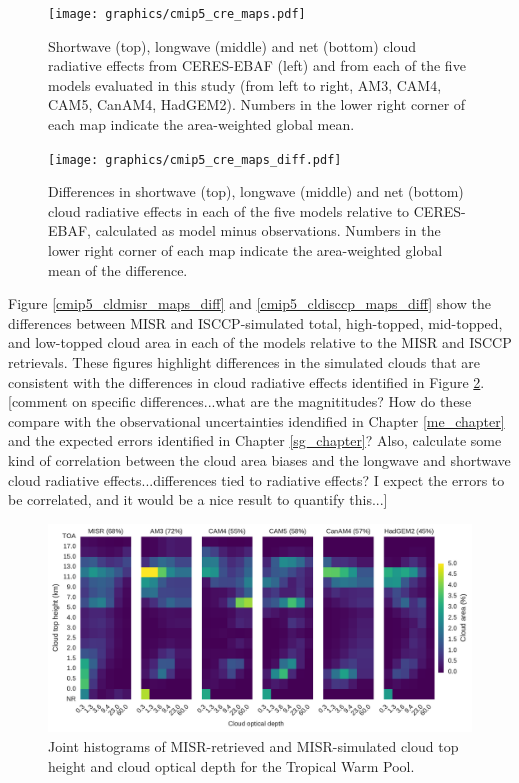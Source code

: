 \begin{figure}
\centering
\texttt{[image: graphics/cmip5\_cre\_maps.pdf]}
\caption{Shortwave (top), longwave (middle) and net (bottom) cloud radiative effects from CERES-EBAF (left) and from each of the five models evaluated in this study (from left to right, AM3, CAM4, CAM5, CanAM4, HadGEM2). Numbers in the lower right corner of each map indicate the area-weighted global mean.}
\label{cmip5_cre_maps}
\end{figure}

\begin{figure}
\centering
\texttt{[image: graphics/cmip5\_cre\_maps\_diff.pdf]}
\caption{Differences in shortwave (top), longwave (middle) and net (bottom) cloud radiative effects in each of the five models relative to CERES-EBAF, calculated as model minus observations. Numbers in the lower right corner of each map indicate the area-weighted global mean of the difference.}
\label{cmip5_cre_maps_diff}
\end{figure}

Figure \ref{cmip5_cldmisr_maps_diff} and \ref{cmip5_cldisccp_maps_diff} show the differences between MISR and ISCCP-simulated total, high-topped, mid-topped, and low-topped cloud area in each of the models relative to the MISR and ISCCP retrievals. These figures highlight differences in the simulated clouds that are consistent with the differences in cloud radiative effects identified in Figure \ref{cmip5_cre_maps_diff}. [comment on specific differences...what are the magnititudes? How do these compare with the observational uncertainties idendified in Chapter \ref{me_chapter} and the expected errors identified in Chapter \ref{sg_chapter}? Also, calculate some kind of correlation between the cloud area biases and the longwave and shortwave cloud radiative effects...differences tied to radiative effects? I expect the errors to be correlated, and it would be a nice result to quantify this...]

\begin{figure}
\centering
\includegraphics[width=\columnwidth]{graphics/cmip5_clMISR_TropicalWarmPool.pdf}
\caption{Joint histograms of MISR-retrieved and MISR-simulated cloud top height and cloud optical depth for the Tropical Warm Pool.}
\label{cmip5_clMISR_TropicalWarmPool}
\end{figure}

